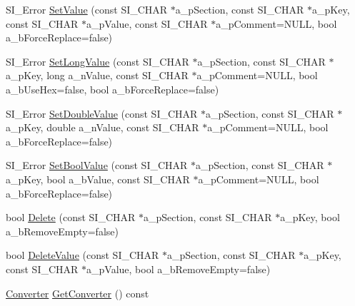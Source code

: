\begin{DoxyCompactItemize}
\item 
S\+I\+\_\+\+Error \hyperlink{classCSimpleIniTempl_aa2014a3dc8fdd638316cf1d3611796ab}{Set\+Value} (const S\+I\+\_\+\+C\+H\+AR $\ast$a\+\_\+p\+Section, const S\+I\+\_\+\+C\+H\+AR $\ast$a\+\_\+p\+Key, const S\+I\+\_\+\+C\+H\+AR $\ast$a\+\_\+p\+Value, const S\+I\+\_\+\+C\+H\+AR $\ast$a\+\_\+p\+Comment=N\+U\+LL, bool a\+\_\+b\+Force\+Replace=false)
\item 
S\+I\+\_\+\+Error \hyperlink{classCSimpleIniTempl_ab2238be407232e4bba0f1343e4793e4e}{Set\+Long\+Value} (const S\+I\+\_\+\+C\+H\+AR $\ast$a\+\_\+p\+Section, const S\+I\+\_\+\+C\+H\+AR $\ast$a\+\_\+p\+Key, long a\+\_\+n\+Value, const S\+I\+\_\+\+C\+H\+AR $\ast$a\+\_\+p\+Comment=N\+U\+LL, bool a\+\_\+b\+Use\+Hex=false, bool a\+\_\+b\+Force\+Replace=false)
\item 
S\+I\+\_\+\+Error \hyperlink{classCSimpleIniTempl_af92ba0b8067553ab693c62a370de6534}{Set\+Double\+Value} (const S\+I\+\_\+\+C\+H\+AR $\ast$a\+\_\+p\+Section, const S\+I\+\_\+\+C\+H\+AR $\ast$a\+\_\+p\+Key, double a\+\_\+n\+Value, const S\+I\+\_\+\+C\+H\+AR $\ast$a\+\_\+p\+Comment=N\+U\+LL, bool a\+\_\+b\+Force\+Replace=false)
\item 
S\+I\+\_\+\+Error \hyperlink{classCSimpleIniTempl_a48ae136fa20c5d7eb7ab0b75342b27cf}{Set\+Bool\+Value} (const S\+I\+\_\+\+C\+H\+AR $\ast$a\+\_\+p\+Section, const S\+I\+\_\+\+C\+H\+AR $\ast$a\+\_\+p\+Key, bool a\+\_\+b\+Value, const S\+I\+\_\+\+C\+H\+AR $\ast$a\+\_\+p\+Comment=N\+U\+LL, bool a\+\_\+b\+Force\+Replace=false)
\item 
bool \hyperlink{classCSimpleIniTempl_aa5c1cdd0b306434d9e9f1422888049da}{Delete} (const S\+I\+\_\+\+C\+H\+AR $\ast$a\+\_\+p\+Section, const S\+I\+\_\+\+C\+H\+AR $\ast$a\+\_\+p\+Key, bool a\+\_\+b\+Remove\+Empty=false)
\item 
bool \hyperlink{classCSimpleIniTempl_a04551ae6c3e92475b2a823d2729652d6}{Delete\+Value} (const S\+I\+\_\+\+C\+H\+AR $\ast$a\+\_\+p\+Section, const S\+I\+\_\+\+C\+H\+AR $\ast$a\+\_\+p\+Key, const S\+I\+\_\+\+C\+H\+AR $\ast$a\+\_\+p\+Value, bool a\+\_\+b\+Remove\+Empty=false)
\item 
\hyperlink{classCSimpleIniTempl_1_1Converter}{Converter} \hyperlink{classCSimpleIniTempl_a98442d01db35187f2770f0a91042cce8}{Get\+Converter} () const 
\end{DoxyCompactItemize}
